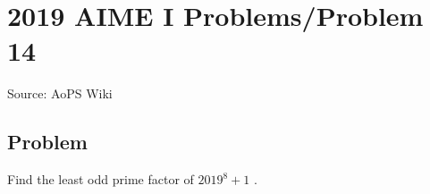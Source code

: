 \documentclass[12pt]{article}
\begin{document}
\section*{{2019 AIME I Problems/Problem 14}}
Source: AoPS Wiki

\subsection*{Problem}
Find the least odd prime factor of $2019^8+1$ .
\end{document}
